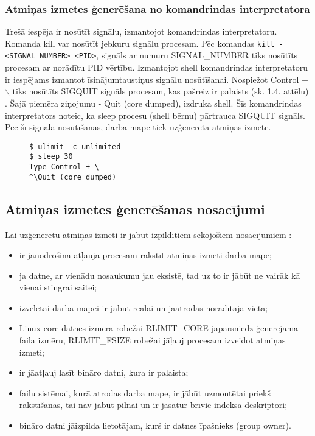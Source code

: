 \subsubsection{Atmiņas izmetes ģenerēšana no komandrindas interpretatora}
Trešā iespēja ir nosūtīt signālu, izmantojot komandrindas interpretatoru. 
Komanda kill var nosūtīt jebkuru signālu procesam.
Pēc komandas  \texttt{kill -<SIGNAL\_NUMBER> <PID>}, signāls ar numuru  SIGNAL\_NUMBER tiks nosūtīts procesam ar norādītu PID vērtību.
Izmantojot shell komandrindas interpretatoru ir  iespējams izmantot īsinājumtaustiņus signālu nosūtīšanai. 
Nospiežot Control + $\backslash$ tiks nosūtīts SIGQUIT signāls procesam, kas pašreiz ir palaists (sk. 1.4. attēlu) \cite {nosacijumi}. 
Šajā piemēra ziņojumu - Quit (core dumped), izdruka shell. 
Šīs komandrindas interpretators noteic, ka  sleep procesu (shell bērnu) pārtrauca SIGQUIT signāls. 
Pēc šī signāla nosūtīšanās, darba mapē tiek uzģenerēta atmiņas izmete. 

\begin{figure}[h]
\begin{lstlisting}[style=customgdb]
$ ulimit –c unlimited
$ sleep 30
Type Control + \
^\Quit (core dumped)
\end{lstlisting}
\caption{\textbf{\fontsize{11}{12}\selectfont {Atmiņas izmetes ģenerēšana, izmantojot īsinājumtaustiņus}}}
\end{figure}
  
\subsection{Atmiņas izmetes ģenerēšanas nosacījumi}
Lai  uzģenerētu atmiņas izmeti ir jābūt izpildītiem sekojošiem nosacījumiem \cite {nosacijumi}:
\begin{itemize}
	\item   ir jānodrošina atļauja procesam rakstīt atmiņas izmeti darba mapē;
	\item 	ja datne, ar vienādu nosaukumu jau eksistē, tad uz to ir jābūt ne vairāk kā vienai stingrai saitei;
	\item 	izvēlētai darba mapei ir jābūt reālai un jāatrodas norādītajā vietā;
	\item 	Linux core datnes izmēra robežai {RLIMIT\_CORE} jāpārsniedz ģenerējamā faila izmēru, { RLIMIT\_FSIZE} robežai jāļauj procesam izveidot atmiņas izmeti;
	\item 	ir  jāatļauj lasīt bināro datni, kura ir palaista;
	\item 	failu sistēmai, kurā atrodas darba mape, ir jābūt uzmontētai priekš rakstīšanas, tai nav jābūt pilnai un ir jāsatur brīvie indeksa deskriptori;
	\item 	bināro datni jāizpilda lietotājam, kurš ir datnes īpašnieks (group owner).
\end{itemize} 
 
